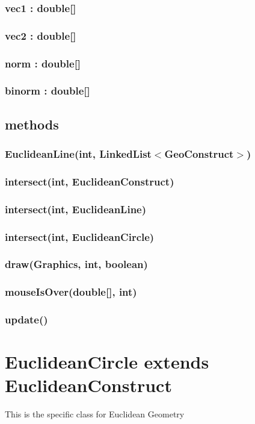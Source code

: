 \documentclass[a4paper,10pt]{report}
\begin{document}
\subsubsection{vec1 : double[]}
\subsubsection{vec2 : double[]}
\subsubsection{norm : double[]}
\subsubsection{binorm : double[]}
\subsection{methods}
\subsubsection{EuclideanLine(int, LinkedList$<$GeoConstruct$>$)}
\subsubsection{intersect(int, EuclideanConstruct)}
\subsubsection{intersect(int, EuclideanLine)}
\subsubsection{intersect(int, EuclideanCircle)}
\subsubsection{draw(Graphics, int, boolean)}
\subsubsection{mouseIsOver(double[], int)}
\subsubsection{update()}
\section{EuclideanCircle extends EuclideanConstruct} This is the specific class for Euclidean Geometry
\end{document}

